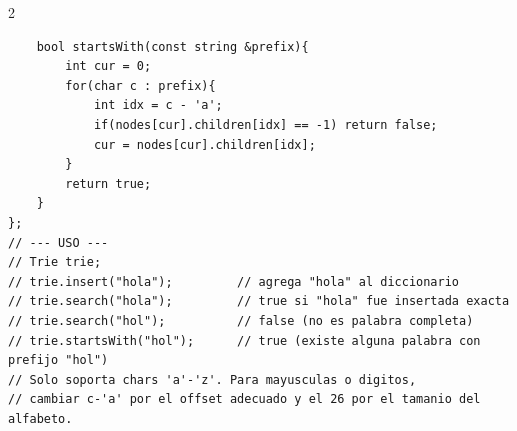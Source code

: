 \documentclass[10pt,a4paper]{article}
\begin{document}
\begin{multicols}{2}
\begin{lstlisting}
    bool startsWith(const string &prefix){
        int cur = 0;
        for(char c : prefix){
            int idx = c - 'a';
            if(nodes[cur].children[idx] == -1) return false;
            cur = nodes[cur].children[idx];
        }
        return true;
    }
};
// --- USO ---
// Trie trie;
// trie.insert("hola");         // agrega "hola" al diccionario
// trie.search("hola");         // true si "hola" fue insertada exacta
// trie.search("hol");          // false (no es palabra completa)
// trie.startsWith("hol");      // true (existe alguna palabra con prefijo "hol")
// Solo soporta chars 'a'-'z'. Para mayusculas o digitos,
// cambiar c-'a' por el offset adecuado y el 26 por el tamanio del alfabeto.
\end{lstlisting}

\end{multicols}
\newpage

\end{document}
